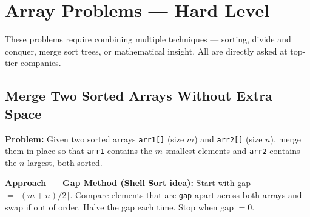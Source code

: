 \documentclass[12pt,a4paper,oneside]{book}
\begin{document}

\chapter{Array Problems --- Hard Level}

{\sloppy These problems require combining multiple techniques --- sorting, divide and conquer, merge sort trees, or mathematical insight. All are directly asked at top-tier companies.\par}

\section{Merge Two Sorted Arrays Without Extra Space}

\textbf{Problem:} Given two sorted arrays \texttt{arr1[]} (size $m$) and \texttt{arr2[]} (size $n$), merge them in-place so that \texttt{arr1} contains the $m$ smallest elements and \texttt{arr2} contains the $n$ largest, both sorted.

\textbf{Approach --- Gap Method (Shell Sort idea):} Start with gap $= \lceil (m+n)/2 \rceil$. Compare elements that are \texttt{gap} apart across both arrays and swap if out of order. Halve the gap each time. Stop when gap $= 0$.
\end{document}
